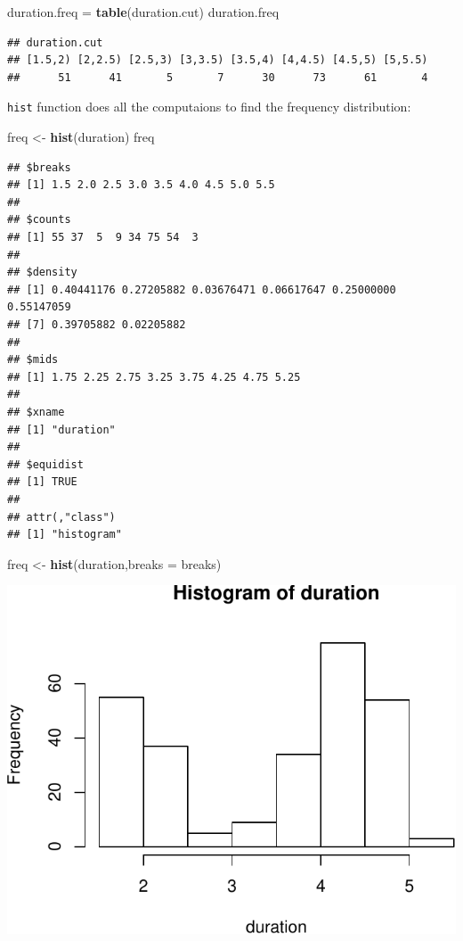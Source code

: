 \documentclass[]{article}
\newenvironment{Shaded}{\begin{snugshade}}{\end{snugshade}}
\newcommand{\KeywordTok}[1]{\textcolor[rgb]{0.13,0.29,0.53}{\textbf{{#1}}}}
\newcommand{\DataTypeTok}[1]{\textcolor[rgb]{0.13,0.29,0.53}{{#1}}}
\newcommand{\StringTok}[1]{\textcolor[rgb]{0.31,0.60,0.02}{{#1}}}
\newcommand{\NormalTok}[1]{{#1}}
\numberwithin{equation}{section}
\begin{document}
\begin{Shaded}
\begin{Highlighting}[]
\NormalTok{duration.freq =}\StringTok{ }\KeywordTok{table}\NormalTok{(duration.cut) }
\NormalTok{duration.freq}
\end{Highlighting}
\end{Shaded}

\begin{verbatim}
## duration.cut
## [1.5,2) [2,2.5) [2.5,3) [3,3.5) [3.5,4) [4,4.5) [4.5,5) [5,5.5) 
##      51      41       5       7      30      73      61       4
\end{verbatim}

\texttt{hist} function does all the computaions to find the frequency
distribution:

\begin{Shaded}
\begin{Highlighting}[]
\NormalTok{freq <-}\StringTok{ }\KeywordTok{hist}\NormalTok{(duration)}
\NormalTok{freq}
\end{Highlighting}
\end{Shaded}

\begin{verbatim}
## $breaks
## [1] 1.5 2.0 2.5 3.0 3.5 4.0 4.5 5.0 5.5
## 
## $counts
## [1] 55 37  5  9 34 75 54  3
## 
## $density
## [1] 0.40441176 0.27205882 0.03676471 0.06617647 0.25000000 0.55147059
## [7] 0.39705882 0.02205882
## 
## $mids
## [1] 1.75 2.25 2.75 3.25 3.75 4.25 4.75 5.25
## 
## $xname
## [1] "duration"
## 
## $equidist
## [1] TRUE
## 
## attr(,"class")
## [1] "histogram"
\end{verbatim}

\begin{Shaded}
\begin{Highlighting}[]
\NormalTok{freq <-}\StringTok{ }\KeywordTok{hist}\NormalTok{(duration,}\DataTypeTok{breaks =} \NormalTok{breaks)}
\end{Highlighting}
\end{Shaded}

\includegraphics{index_files/figure-latex/unnamed-chunk-107-1.pdf}
\end{document}
